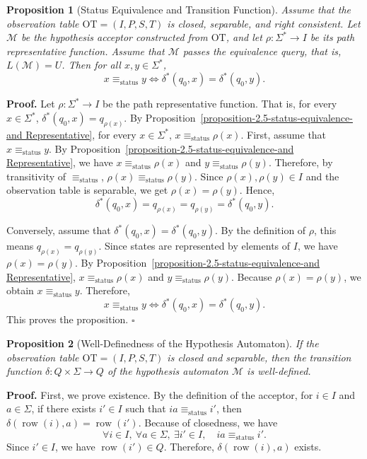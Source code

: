 \documentclass{ieice-tecrep}
\newtheorem{proposition}{Proposition}
\begin{document}
\begin{proposition}[Status Equivalence and Transition Function]\label{proposition-2.6-status-equivalence-and-transition-function}
Assume that the observation table
\(\mathrm{OT}=(I,P,S,T)\) is closed, separable, and right consistent.
Let \(\mathcal{M}\) be the hypothesis acceptor constructed from \(\mathrm{OT}\),
and let \(\rho:\Sigma^*\to I\) be its path representative function.
Assume that \(\mathcal{M}\) passes the equivalence query, that is, \(L(\mathcal{M})=U\). Then for all \(x,y\in\Sigma^*\),
\[
x\equiv_{\mathrm{status}}y
\Longleftrightarrow
\delta^*(q_0,x)=\delta^*(q_0,y).
\]
\end{proposition}
\noindent\textbf{Proof.} Let \(\rho:\Sigma^*\to I\) be the path representative function. That is,
for every \(x\in\Sigma^*\), \(\delta^*(q_0,x)=q_{\rho(x)}\). By Proposition~\ref{proposition-2.5-status-equivalence-and Representative}, for every \(x\in\Sigma^*\), \(x\equiv_{\mathrm{status}}\rho(x)\). First, assume that \(x\equiv_{\mathrm{status}}y\). By Proposition~\ref{proposition-2.5-status-equivalence-and Representative}, we have \(x\equiv_{\mathrm{status}}\rho(x)\) and \(y\equiv_{\mathrm{status}}\rho(y)\). Therefore, by transitivity of \(\equiv_{\mathrm{status}}\), \(\rho(x)\equiv_{\mathrm{status}}\rho(y)\). Since \(\rho(x),\rho(y)\in I\) and the observation table is separable,
we get \(\rho(x)=\rho(y)\). Hence,
\[
\delta^*(q_0,x)=q_{\rho(x)}=q_{\rho(y)}=\delta^*(q_0,y).
\]

Conversely, assume that \(\delta^*(q_0,x)=\delta^*(q_0,y)\). By the definition of \(\rho\), this means \(q_{\rho(x)}=q_{\rho(y)}\). Since states are represented by elements of \(I\), we have \(\rho(x)=\rho(y)\). By Proposition~\ref{proposition-2.5-status-equivalence-and Representative}, \(x\equiv_{\mathrm{status}}\rho(x)\) and \(y\equiv_{\mathrm{status}}\rho(y)\). Because \(\rho(x)=\rho(y)\), we obtain \(x\equiv_{\mathrm{status}}y\). Therefore,
\[
x\equiv_{\mathrm{status}}y
\Longleftrightarrow
\delta^*(q_0,x)=\delta^*(q_0,y).
\]
This proves the proposition. \hfill $\square$

\begin{proposition}[Well-Definedness of the Hypothesis Automaton]\label{proposition-3-well-definedness-of-the-hypothesis-automaton}
If the observation table \(\mathrm{OT}=(I,P,S,T)\) is closed and separable, 
then the transition function \(\delta:Q\times\Sigma\to Q\) of the hypothesis automaton \(\mathcal{M}\) is well-defined.
\end{proposition}
\noindent\textbf{Proof.} First, we prove existence. By the definition of the
acceptor, for \(i\in I\) and \(a\in\Sigma\), if there exists \(i'\in I\)
such that \(ia\equiv_{\mathrm{status}}i'\), then \(\delta(\operatorname{row}(i),a)=\operatorname{row}(i')\). Because of closedness, we have
\[
\forall i\in I,\ \forall a\in\Sigma,\ \exists i'\in I,\quad
ia\equiv_{\mathrm{status}}i'.
\]
Since \(i'\in I\), we have \(\operatorname{row}(i')\in Q\). Therefore, \(\delta(\operatorname{row}(i),a)\) exists.
\end{document}
